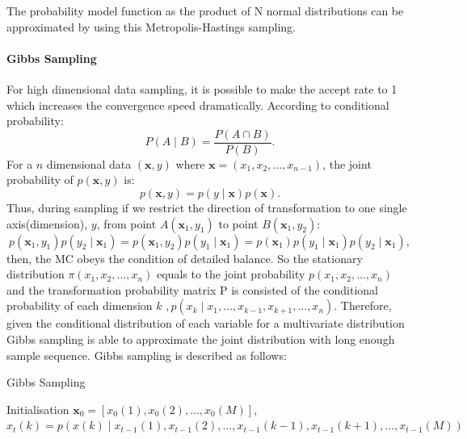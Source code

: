 The probability model function as the product of N normal distributions can be approximated by using this Metropolis-Hastings sampling.

\paragraph{Gibbs Sampling}
\label{sec:Gibbs}
For high dimensional data sampling, it is possible to make the accept rate to 1 which increases the convergence speed dramatically.
According to conditional probability:
\begin{equation}
P(A \mid B) = \frac{P(A \cap B)}{P(B)}.
\end{equation}
For a $ n $ dimensional data $ (\mathbf{x}, y) $ where $ \mathbf{x}=(x_1,x_2,...,x_{n-1}) $, the joint probability of $p(\mathbf{x},y)$ is:
\begin{equation}
p(\mathbf{x},y) = p(y \mid \mathbf{x})p(\mathbf{x}).
\end{equation}
Thus, during sampling if we restrict the direction of transformation to one single axis(dimension), $ y $, from point $ A(\mathbf{x}_1, y_1) $ to point $ B(\mathbf{x}_1, y_2)$:
\begin{equation}
p(\mathbf{x}_1, y_1)p(y_2 \mid \mathbf{x}_1) = p(\mathbf{x}_1, y_2)p(y_1 \mid \mathbf{x}_1) = p(\mathbf{x}_1)p(y_1 \mid \mathbf{x}_1)p(y_2 \mid \mathbf{x}_1),
\end{equation}
then, the MC obeys the condition of detailed balance.
So the stationary distribution $ \pi(x_1,x_2,...,x_n) $ equals to the joint probability $ p(x_1,x_2,...,x_n) $ and the transformation probability matrix P is consisted of the conditional probability of each dimension $ k $ $,  p(x_k \mid x_1,...,x_{k-1},x_{k+1},...,x_n) $.
Therefore, given the conditional distribution of each variable for a multivariate distribution Gibbs sampling is able to approximate the joint distribution with long enough sample sequence.
Gibbs sampling is described as follows:
\begin{algorithm}[h]
	\caption{Gibbs Sampling}
	\label{alg:gibbs}
	\begin{algorithmic}
		
		\State Initialisation $\mathbf{x}_0 = [x_0(1),x_0(2),...,x_0(M)]$,  
		\State $ x_t(k) = p(x(k) \mid x_{t-1}(1),x_{t-1}(2),...,x_{t-1}(k-1),x_{t-1}(k+1),...,x_{t-1}(M))$\\
		\EndFor
		\EndFor
	\end{algorithmic}
\end{algorithm}

